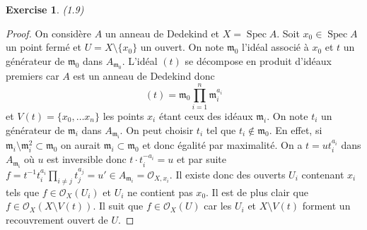 \documentclass[A4, 11pt]{article}
\newtheorem{exer}{Exercise}
\def\Spec{ \operatorname{Spec}}
\begin{document}
 \begin{exer}(1.9)
 \end{exer}
 \begin{proof}
 On considère $A$ un anneau de Dedekind et $X=\Spec A$. Soit $x_0\in \Spec A$ un point fermé et $U=X\setminus \{x_0\}$ un ouvert. On note $\mathfrak{m}_0$ l'idéal associé à $x_0$ et $t$ un générateur de $\mathfrak{m_0}$ dans $A_{\mathfrak{m}_0}$. L'idéal $(t)$ se décompose en produit d'idéaux premiers car $A$ est un anneau de Dedekind donc 
 $$(t)= \mathfrak{m}_0 \prod\limits_{i=1}^{n} \mathfrak{m}_i^{a_i}$$
 et $V(t)=\{x_0,\dots x_n\}$ les points $x_i$ étant ceux des idéaux $\mathfrak{m}_i$.
 On note $t_i$ un générateur de $\mathfrak{m}_i$ dans $A_{\mathfrak{m_i}}$. On peut choisir $t_i$ tel que $t_i\notin \mathfrak{m}_0$. En effet, si $\mathfrak{m}_i\setminus \mathfrak{m}_i^2 \subset \mathfrak{m}_0$ on aurait $\mathfrak{m}_i\subset \mathfrak{m}_0$ et donc égalité par maximalité. On a $t=ut_i^{a_i}$ dans $A_{\mathfrak{m_i}}$ où $u$ est inversible donc $t\cdot t_i^{-a_i}=u$ et par suite $f=t^{-1}t_i^{a_i}\prod\limits_{i\neq j} t_j^{a_j} =u'\in A_{\mathfrak{m}_i}=\mathcal{O}_{X,x_i}$. Il existe donc des ouverts $U_i$ contenant $x_i$ tels que $f\in \mathcal{O}_X(U_i)$  et $U_i$ ne contient pas $x_0$. Il est de plus clair que $f\in \mathcal{O}_X(X\setminus V(t))$. Il suit que $f\in \mathcal{O}_X(U)$ car les $U_i$ et $X\setminus V(t)$ forment un recouvrement ouvert de $U$.
 \end{proof}
\end{document}

